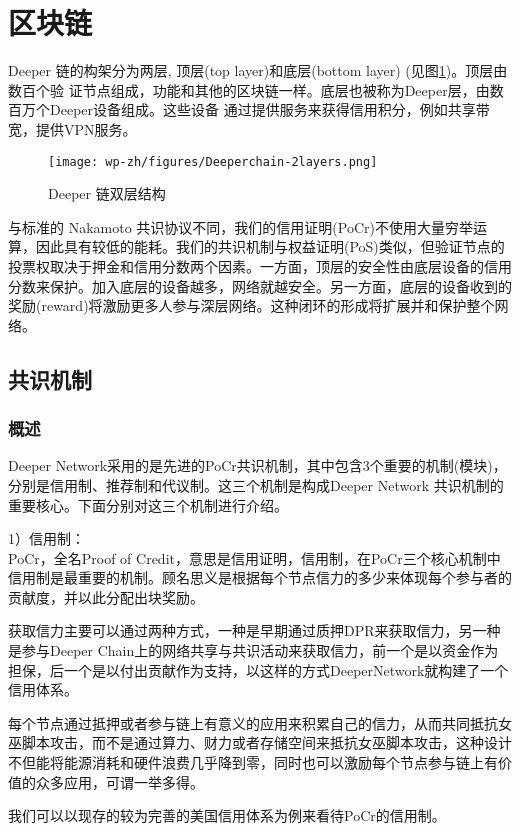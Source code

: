 \documentclass[a4paper]{article}
\begin{document}
\newpage
\section{区块链}
Deeper 链的构架分为两层, 顶层(top layer)和底层(bottom layer) (见图\ref{fig:2-layers})。顶层由数百个验
证节点组成，功能和其他的区块链一样。底层也被称为Deeper层，由数百万个Deeper设备组成。这些设备 通过提供服务来获得信用积分，例如共享带宽，提供VPN服务。

\begin{figure}[hhhh]
\centering
\texttt{[image: wp-zh/figures/Deeperchain-2layers.png]}
\caption{Deeper 链双层结构}
\label{fig:2-layers}
\end{figure}

与标准的 Nakamoto 共识协议不同，我们的信用证明(PoCr)不使用大量穷举运算，因此具有较低的能耗。我们的共识机制与权益证明(PoS)类似，但验证节点的投票权取决于押金和信用分数两个因素。一方面，顶层的安全性由底层设备的信用分数来保护。加入底层的设备越多，网络就越安全。另一方面，底层的设备收到的奖励(reward)将激励更多人参与深层网络。这种闭环的形成将扩展并和保护整个网络。

\subsection{共识机制}
\subsubsection{概述}
Deeper Network采用的是先进的PoCr共识机制，其中包含3个重要的机制(模块)，分别是信用制、推荐制和代议制。这三个机制是构成Deeper Network 共识机制的重要核心。下面分别对这三个机制进行介绍。

1）信用制：\\
PoCr，全名Proof of Credit，意思是信用证明，信用制，在PoCr三个核心机制中信用制是最重要的机制。顾名思义是根据每个节点信力的多少来体现每个参与者的贡献度，并以此分配出块奖励。

获取信力主要可以通过两种方式，一种是早期通过质押DPR来获取信力，另一种是参与Deeper Chain上的网络共享与共识活动来获取信力，前一个是以资金作为担保，后一个是以付出贡献作为支持，以这样的方式DeeperNetwork就构建了一个信用体系。

每个节点通过抵押或者参与链上有意义的应用来积累自己的信力，从而共同抵抗女巫脚本攻击，而不是通过算力、财力或者存储空间来抵抗女巫脚本攻击，这种设计不但能将能源消耗和硬件浪费几乎降到零，同时也可以激励每个节点参与链上有价值的众多应用，可谓一举多得。

我们可以以现存的较为完善的美国信⽤体系为例来看待PoCr的信用制。
\end{document}
